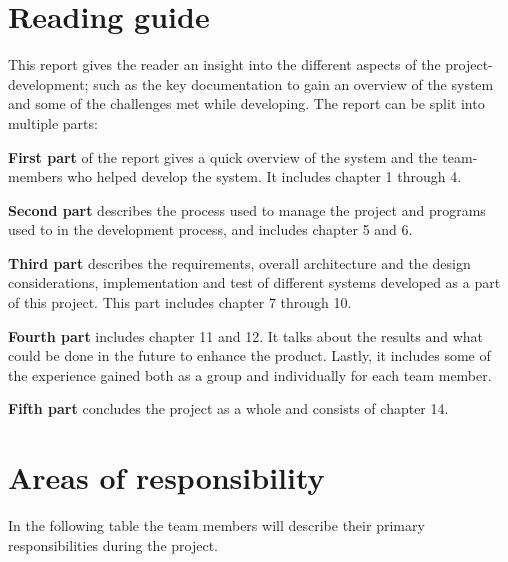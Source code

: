 \section{Reading guide}
This report gives the reader an insight into the different aspects of the project-development; such as the key documentation to gain an overview of the system and some of the challenges met while developing. The report can be split into multiple parts:

\textbf{First part} of the report gives a quick overview of the system and the team-members who helped develop the system. It includes chapter 1 through 4.

\textbf{Second part} describes the process used to manage the project and programs used to in the development process, and includes chapter 5 and 6.

\textbf{Third part} describes the requirements, overall architecture and the design considerations, implementation and test of different systems developed as a part of this project. This part includes chapter 7 through 10.

\textbf{Fourth part} includes chapter 11 and 12. It talks about the results and what could be done in the future to enhance the product. Lastly, it includes some of the experience gained both as a group and individually for each team member.

\textbf{Fifth part} concludes the project as a whole and consists of chapter 14.

\clearpage
\section{Areas of responsibility}
In the following table the team members will describe their primary responsibilities during the project. 

